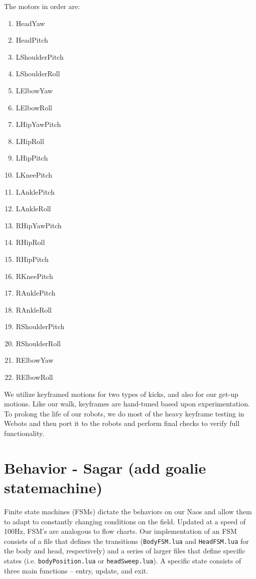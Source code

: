 \documentclass{article}
\begin{document}
  	The motors in order are:
	  \begin{multicols}{3}
		  \begin{enumerate}
			  \item HeadYaw
  			\item HeadPitch
	  		\item LShoulderPitch
		  	\item LShoulderRoll
			  \item LElbowYaw
  			\item LElbowRoll
	  		\item LHipYawPitch
		  	\item LHipRoll
			  \item LHipPitch
  			\item LKneePitch
	  		\item LAnklePitch
		  	\item LAnkleRoll
			  \item RHipYawPitch
  			\item RHipRoll
	  		\item RHipPitch
		  	\item RKneePitch
			  \item RAnklePitch
  			\item RAnkleRoll
	  		\item RShoulderPitch
		  	\item RShoulderRoll
			  \item RElbowYaw
  			\item RElbowRoll
	  	\end{enumerate}
  	\end{multicols}

	  We utilize keyframed motions for two types of kicks, and also for our get-up motions. Like our walk, keyframes are hand-tuned based upon experimentation. To prolong the life of our robots, we do most of the heavy keyframe testing in Webots and then port it to the robots and perform final checks to verify full functionality.



\section{Behavior - Sagar (add goalie statemachine)}
	Finite state machines (FSMs) dictate the behaviors on our Naos and allow them to adapt to constantly changing conditions on the field. Updated at a speed of 100Hz, FSM's are analogous to flow charts. Our implementation of an FSM consists of a file that defines the transitions (\texttt{BodyFSM.lua} and \texttt{HeadFSM.lua} for the body and head, respectively) and a series of larger files that define specific states (i.e. \texttt{bodyPosition.lua} or \texttt{headSweep.lua}). A specific state consists of three main functions – entry, update, and exit. 
\end{document}
